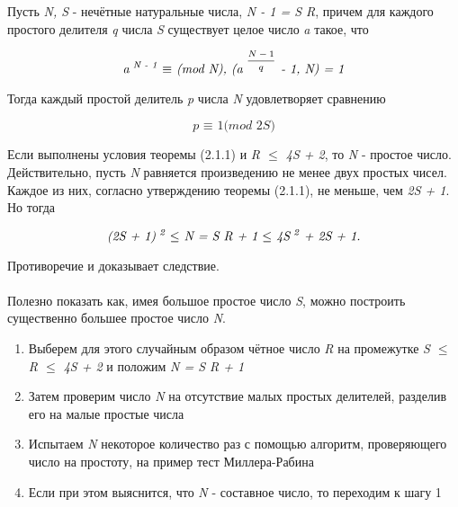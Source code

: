   \begin{theorem}
  
      Пусть \textit{N, S} - нечётные натуральные числа, \textit{N - 1 = S R}, причем для каждого простого делителя \textit{q}  
  числа \textit{S} существует целое число \textit{a} такое, что

    \begin{equation}
      \textit{a\textsuperscript{ N - 1} {$\equiv$} (mod N), (a\textsuperscript{ {$\frac{N - 1}{q}$}} - 1, N) = 1}
    \end{equation}

  Тогда каждый простой делитель \textit{p} числа \textit{N} удовлетворяет сравнению

    \begin{equation}
      \textit{p {$\equiv$} 1(mod 2S)}
    \end{equation}  
  
  \end{theorem}
  
  \begin{cons} 
    Если выполнены условия теоремы (2.1.1) и \textit{R {$\le$} 4S + 2}, то \textit{N} - простое число. Действительно, пусть \textit{N}  
  равняется произведению не менее двух простых чисел. Каждое из них, согласно утверждению теоремы (2.1.1), не меньше, чем \textit{2S + 1}. Но тогда 

    \begin{equation}
      \textit{(2S + 1)\textsuperscript{ 2} {$ \le $} N = S R + 1 {$ \le $} 4S\textsuperscript{ 2} + 2S + 1.}
    \end{equation}

    Противоречие и доказывает следствие.
  \end{cons}
  
  \paragraph{} Полезно показать как, имея большое простое число \textit{S}, можно построить существенно большее простое число \textit{N}. 
  
    \begin{enumerate}
     \item Выберем для этого случайным образом чётное число \textit{R} на промежутке \textit{S {$\le$} R {$\le$} 4S + 2} и положим \textit{N = S R + 1} 
     \item Затем проверим число \textit{N} на отсутствие малых простых делителей, разделив его на малые простые числа
     \item Испытаем \textit{N} некоторое количество раз с помощью алгоритм, проверяющего число на простоту, на пример тест Миллера-Рабина 
     \item Если при этом выяснится, что \textit{N} - составное число, то переходим к шагу 1 
    \end{enumerate}

